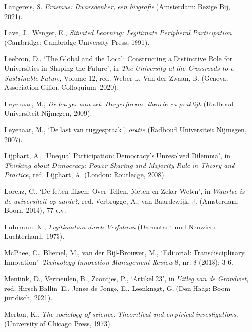 \documentclass[smallauthor, chapterhaspagenum, nochapterinheader, pagenuminheader,  bigchapnum,medium2, tocpages, garamond, titleinheader]{jote-book}
\begin{document}
\begin{references}
		Langereis, S. \emph{Erasmus: }\emph{Dwarsdenker}\emph{, }\emph{een}\emph{ }\emph{biografie} (Amsterdam: Bezige Bij, 2021).



		Lave, J., Wenger, E., \emph{Situated Learning: Legitimate Peripheral Participation} (Cambridge: Cambridge University Press, 1991).



		Leebron, D., ‘The Global and the Local: Constructing a Distinctive Role for Universities in Shaping the Future', in \emph{The University at the Crossroads to a Sustainable Future,} Volume 12, red. Weber L, Van der Zwaan, B. (Geneva: Association Gilion Colloquium, 2020).



		Leyenaar, M., \emph{De burger }\emph{aan}\emph{ }\emph{zet}\emph{: }\emph{Burgerforum}\emph{: }\emph{theorie}\emph{ }\emph{en}\emph{ }\emph{praktijk} (Radboud Universiteit Nijmegen, 2009).



		Leyenaar, M., ‘De last van ruggespraak\emph{'},\emph{ }\emph{o}\emph{ratie}\emph{ }(Radboud Universiteit Nijmegen, 2007).



		Lijphart, A., ‘Unequal Participation: Democracy's Unresolved Dilemma', in \emph{Thinking about Democracy: Power Sharing and Majority Rule in Theory and Practice}, red. Lijphart, A. (London: Routledge, 2008).



		Lorenz, C., ‘De feiten fiksen: Over Tellen, Meten en Zeker Weten', in \emph{Waartoe}\emph{ is de }\emph{universiteit}\emph{ op }\emph{aarde}\emph{?}, red. Verbrugge, A., van Baardewijk, J. (Amsterdam: Boom, 2014), 77 e.v.



		Luhmann. N., \emph{Legitimation }\emph{durch}\emph{ }\emph{Verfahren} (Darmstadt und Neuwied: Luchterhand, 1975).



		McPhee, C., Bliemel, M., van der Bijl-Brouwer, M., ‘Editorial: Transdisciplinary Innovation', \emph{Technology Innovation Management Review} 8, nr. 8 (2018): 3-6.



		Mentink, D., Vermeulen, B., Zoontjes, P., ‘Artikel 23', in \emph{Uitleg}\emph{ van de }\emph{Grondwet}, red. Hirsch Ballin, E., Janse de Jonge, E., Leenknegt, G. (Den Haag: Boom juridisch, 2021).



		Merton, K., \emph{The sociology of science: Theoretical and empirical investigations}. (University of Chicago Press, 1973).




\end{references}
\end{document}
